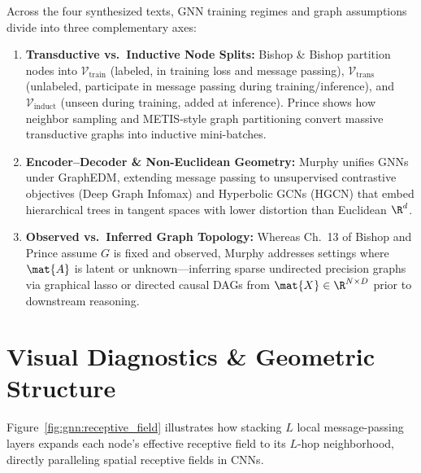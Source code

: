 \documentclass[../../../../master.tex]{subfiles}
\begin{document}
\begin{crossbook}
\label{box:gnn:synthesis}
Across the four synthesized texts, GNN training regimes and graph assumptions divide into three complementary axes:
\begin{enumerate}
  \item \textbf{Transductive vs.\ Inductive Node Splits:} Bishop \& Bishop  partition nodes into $\mathcal{V}_{\mathrm{train}}$ (labeled, in training loss and message passing), $\mathcal{V}_{\mathrm{trans}}$ (unlabeled, participate in message passing during training/inference), and $\mathcal{V}_{\mathrm{induct}}$ (unseen during training, added at inference). Prince  shows how neighbor sampling and METIS-style graph partitioning convert massive transductive graphs into inductive mini-batches.
  \item \textbf{Encoder--Decoder \& Non-Euclidean Geometry:} Murphy  unifies GNNs under GraphEDM, extending message passing to unsupervised contrastive objectives (Deep Graph Infomax) and Hyperbolic GCNs (HGCN) that embed hierarchical trees in tangent spaces with lower distortion than Euclidean $\R^d$.
  \item \textbf{Observed vs.\ Inferred Graph Topology:} Whereas Ch.~13 of Bishop and Prince assume $G$ is fixed and observed, Murphy  addresses settings where $\mat{A}$ is latent or unknown---inferring sparse undirected precision graphs via graphical lasso or directed causal DAGs from $\mat{X} \in \R^{N \times D}$ prior to downstream reasoning.
\end{enumerate}
\end{crossbook}

\section{Visual Diagnostics \& Geometric Structure}
\label{sec:gnn:visuals}

Figure~\ref{fig:gnn:receptive_field} illustrates how stacking $L$ local message-passing layers expands each node's effective receptive field to its $L$-hop neighborhood, directly paralleling spatial receptive fields in CNNs.
\end{document}
